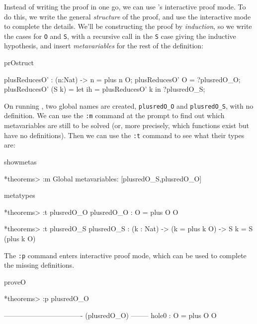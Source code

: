 Instead of writing the proof in one go, we can use \Idris{}'s interactive
proof mode. To do this, we write the general \emph{structure} of the proof,
and use the interactive mode to complete the details. We'll be constructing
the proof by \emph{induction}, so we write the cases for \texttt{O} and
\texttt{S}, with a recursive call in the \texttt{S} case giving the inductive
hypothesis, and insert \emph{metavariables} for the rest of the definition:

\begin{SaveVerbatim}{prOstruct}

plusReducesO' : (n:Nat) -> n = plus n O;
plusReducesO' O     = ?plusredO_O;
plusReducesO' (S k) = let ih = plusReducesO' k in
                      ?plusredO_S;

\end{SaveVerbatim}

\noindent
On running \Idris{}, two global names are created, \texttt{plusredO\_O} and
\texttt{plusredO\_S}, with no definition. We can use the \texttt{:m} command
at the prompt to find out which metavariables are still to be solved (or, more
precisely, which functions exist but have no definitions). Then we can use the
\texttt{:t} command to see what their types are:

\begin{SaveVerbatim}{showmetas}

*theorems> :m 
Global metavariables:
        [plusredO_S,plusredO_O]

\end{SaveVerbatim}

\begin{SaveVerbatim}{metatypes}

*theorems> :t plusredO_O 
plusredO_O : O = plus O O

*theorems> :t plusredO_S 
plusredO_S : (k : Nat) -> (k = plus k O) -> S k = S (plus k O)

\end{SaveVerbatim}


\noindent
The \texttt{:p} command enters interactive proof mode, which can be used to complete
the missing definitions.

\begin{SaveVerbatim}{proveO}

*theorems> :p plusredO_O

---------------------------------- (plusredO_O) --------
{hole0} : O = plus O O

\end{SaveVerbatim}

